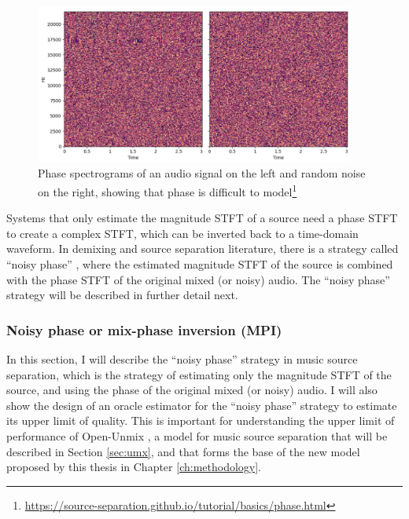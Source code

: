 \documentclass[report.tex]{subfiles}
\begin{document}
\begin{figure}[ht]
       \centering
        \begin{minipage}{1.\textwidth}
               \renewcommand\footnoterule{} %
               \renewcommand{\thempfootnote}{\fnsymbol{mpfootnote}}
               \includegraphics[width=0.9375\textwidth]{./images-mss/whynophase.png}
		\caption[Phase spectrograms of an audio signal on the left and random noise on the right, showing that phase is difficult to model]{Phase spectrograms of an audio signal on the left and random noise on the right, showing that phase is difficult to model\footnote[1]{\url{https://source-separation.github.io/tutorial/basics/phase.html}}}
               \label{fig:noisyphase}
       \end{minipage}
\end{figure}

Systems that only estimate the magnitude STFT of a source need a phase STFT to create a complex STFT, which can be inverted back to a time-domain waveform. In demixing and source separation literature, there is a strategy called ``noisy phase'' \parencite{noisyphase1, noisyphase2}, where the estimated magnitude STFT of the source is combined with the phase STFT of the original mixed (or noisy) audio. The ``noisy phase'' strategy will be described in further detail next.

\subsubsection{Noisy phase or mix-phase inversion (MPI)}
\label{sec:noisyphaseoracle}

In this section, I will describe the ``noisy phase'' strategy in music source separation, which is the strategy of estimating only the magnitude STFT of the source, and using the phase of the original mixed (or noisy) audio. I will also show the design of an oracle estimator for the ``noisy phase'' strategy to estimate its upper limit of quality. This is important for understanding the upper limit of performance of Open-Unmix \parencite{umx}, a model for music source separation that will be described in Section \ref{sec:umx}, and that forms the base of the new model proposed by this thesis in Chapter \ref{ch:methodology}.
\end{document}
